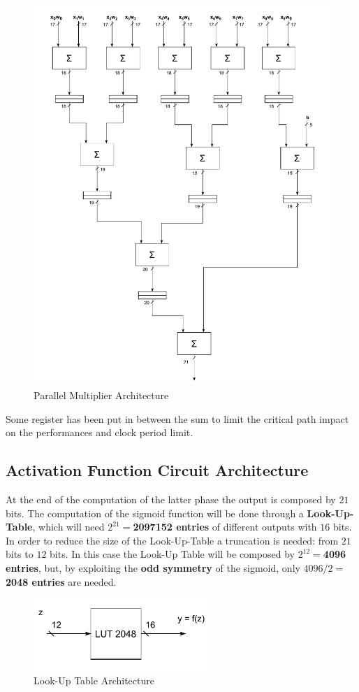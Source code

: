 \begin{figure}[H]
	\centering
	\includegraphics[width=\textwidth]{img/architecture_adder_tree.pdf}
	\caption{Parallel Multiplier Architecture}
\end{figure}

Some register has been put in between the sum to limit the critical path impact on the performances and clock period limit.

\subsection{Activation Function Circuit Architecture}
At the end of the computation of the latter phase the output is composed by $21$ bits. The computation of the sigmoid function will be done through a \textbf{Look-Up-Table}, which will need \textbf{$2^{21} = $2097152 entries} of different outputs with $16$ bits. In order to reduce the size of the Look-Up-Table a truncation is needed: from $21$ bits to $12$ bits. In this case the Look-Up Table will be composed by \textbf{$2^{12} = $4096 entries}, but, by exploiting the \textbf{odd symmetry} of the sigmoid, only \textbf{$4096/2 = $ 2048 entries} are needed.
\begin{figure}[H]
	\centering
	\includegraphics[width=0.6\textwidth]{img/architecture_lut_optimized.pdf}
	\caption{Look-Up Table Architecture}
\end{figure}
 